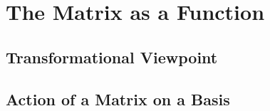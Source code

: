 \documentclass[elementsmain.tex]{subfiles}
\begin{document}
\section{The Matrix as a Function}

\subsection*{Transformational Viewpoint}


\subsection*{Action of a Matrix on a Basis}




\clearpage
\end{document}
